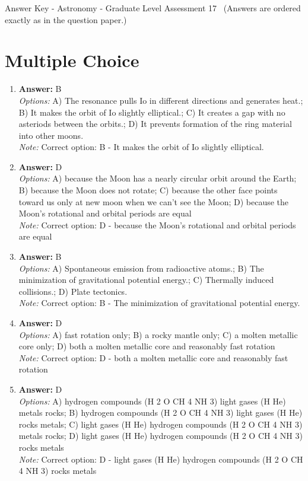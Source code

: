 \documentclass[12pt]{article}
\begin{document}
\begin{center}
Answer Key - Astronomy - Graduate Level Assessment 17 \
\small (Answers are ordered exactly as in the question paper.)
\end{center}

\section*{Multiple Choice}
\begin{enumerate}[label=\arabic*.]
\item \textbf{Answer:} B
\\ \textit{Options:} A) The resonance pulls Io in different directions and generates heat.; B) It makes the orbit of Io slightly elliptical.; C) It creates a gap with no asteriods between the orbits.; D) It prevents formation of the ring material into other moons.
\\ \textit{Note:} Correct option: B - It makes the orbit of Io slightly elliptical.
\item \textbf{Answer:} D
\\ \textit{Options:} A) because the Moon has a nearly circular orbit around the Earth; B) because the Moon does not rotate; C) because the other face points toward us only at new moon when we can't see the Moon; D) because the Moon's rotational and orbital periods are equal
\\ \textit{Note:} Correct option: D - because the Moon's rotational and orbital periods are equal
\item \textbf{Answer:} B
\\ \textit{Options:} A) Spontaneous emission from radioactive atoms.; B) The minimization of gravitational potential energy.; C) Thermally induced collisions.; D) Plate tectonics.
\\ \textit{Note:} Correct option: B - The minimization of gravitational potential energy.
\item \textbf{Answer:} D
\\ \textit{Options:} A) fast rotation only; B) a rocky mantle only; C) a molten metallic core only; D) both a molten metallic core and reasonably fast rotation
\\ \textit{Note:} Correct option: D - both a molten metallic core and reasonably fast rotation
\item \textbf{Answer:} D
\\ \textit{Options:} A) hydrogen compounds (H 2 O CH 4 NH 3) light gases (H He) metals rocks; B) hydrogen compounds (H 2 O CH 4 NH 3) light gases (H He) rocks metals; C) light gases (H He) hydrogen compounds (H 2 O CH 4 NH 3) metals rocks; D) light gases (H He) hydrogen compounds (H 2 O CH 4 NH 3) rocks metals
\\ \textit{Note:} Correct option: D - light gases (H He) hydrogen compounds (H 2 O CH 4 NH 3) rocks metals
\end{enumerate}
\end{document}
